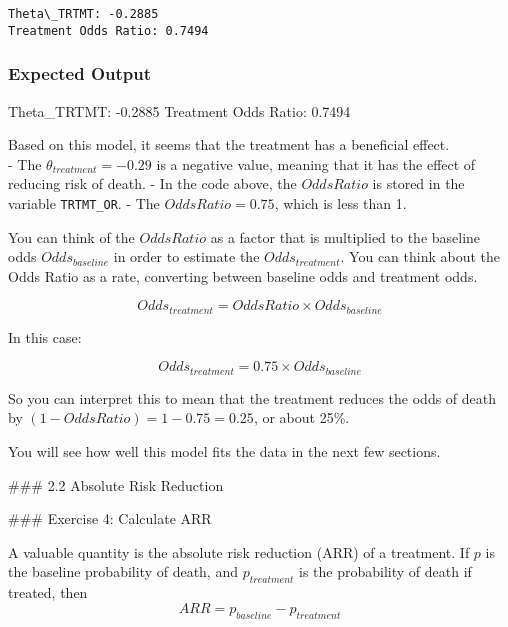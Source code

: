 \documentclass[11pt]{article}
\newenvironment{Shaded}{}{}
\newcommand{\FloatTok}[1]{\textcolor[rgb]{0.25,0.63,0.44}{{#1}}}
\newcommand{\NormalTok}[1]{{#1}}
\begin{document}
    \begin{Verbatim}[commandchars=\\\{\}]
Theta\_TRTMT: -0.2885
Treatment Odds Ratio: 0.7494

    \end{Verbatim}

    \hypertarget{expected-output}{%
\subsubsection{Expected Output}\label{expected-output}}

\begin{Shaded}
\begin{Highlighting}[]
\NormalTok{Theta_TRTMT: }\FloatTok{-0.2885}
\NormalTok{Treatment Odds Ratio: }\FloatTok{0.7494}
\end{Highlighting}
\end{Shaded}

    Based on this model, it seems that the treatment has a beneficial
effect.\\
- The \(\theta_{treatment} = -0.29\) is a negative value, meaning that
it has the effect of reducing risk of death. - In the code above, the
\(OddsRatio\) is stored in the variable \texttt{TRTMT\_OR}. - The
\(OddsRatio = 0.75\), which is less than 1.

You can think of the \(OddsRatio\) as a factor that is multiplied to the
baseline odds \(Odds_{baseline}\) in order to estimate the
\(Odds_{treatment}\). You can think about the Odds Ratio as a rate,
converting between baseline odds and treatment odds.

\[Odds_{treatment} = OddsRatio \times Odds_{baseline}\]

In this case:

\[Odds_{treatment} = 0.75 \times Odds_{baseline}\]

So you can interpret this to mean that the treatment reduces the odds of
death by \((1 - OddsRatio) = 1 - 0.75 = 0.25\), or about 25\%.

You will see how well this model fits the data in the next few sections.

     \#\#\# 2.2 Absolute Risk Reduction

     \#\#\# Exercise 4: Calculate ARR

A valuable quantity is the absolute risk reduction (ARR) of a treatment.
If \(p\) is the baseline probability of death, and \(p_{treatment}\) is
the probability of death if treated, then
\[ARR = p_{baseline} - p_{treatment} \]
\end{document}

